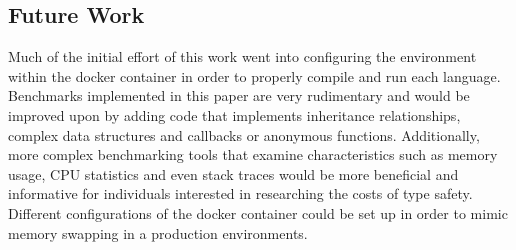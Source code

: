 \subsection{Future Work}
Much of the initial effort of this work went into configuring the environment within the docker container in order to properly compile and run each language. Benchmarks implemented in this paper are very rudimentary and would be improved upon by adding code that implements inheritance relationships, complex data structures and callbacks or anonymous functions. Additionally, more complex benchmarking tools that examine characteristics such as memory usage, CPU statistics and even stack traces would be more beneficial and informative for individuals interested in researching the costs of type safety. Different configurations of the docker container could be set up in order to mimic memory swapping in a production environments. 


